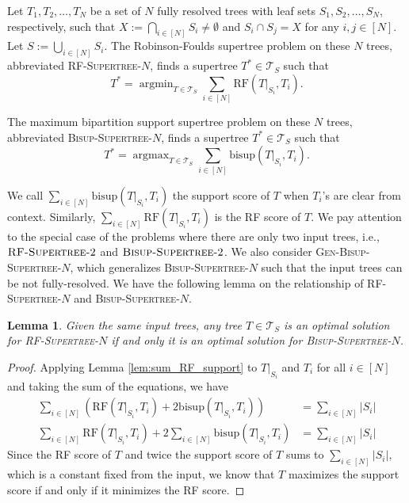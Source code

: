 \documentclass{bmcart}
\newcommand{\bs}{\mathrm{bisup}}
\newcommand{\RF}{\mathrm{RF}}
\newcommand{\bisuptwo}{\textsc{Bisup-Supertree-$2$}\xspace}
\newcommand{\bisupn}{\textsc{Bisup-Supertree-$N$}\xspace}
\newcommand{\genbisup}{\textsc{Gen-Bisup-Supertree-$N$}\xspace}
\newcommand{\rfn}{\textsc{RF-Supertree-$N$}\xspace}
\newcommand{\rftwo}{\textsc{RF-Supertree-$2$}\xspace}
\DeclareMathOperator*{\argmin}{argmin}
\DeclareMathOperator*{\argmax}{argmax}
\newtheorem{lemma}{Lemma}
\begin{document}


Let $T_1,T_2,\dots,T_N$ be a set of $N$ fully resolved trees with leaf sets $S_1,S_2,\dots,S_N$, respectively, such that $X:= \bigcap_{i \in [N]} S_i \neq \emptyset$ and $S_i \cap S_j = X$ for any $i,j \in [N]$. Let $S := \bigcup_{i \in [N]}S_i$. The Robinson-Foulds supertree problem on these $N$ trees, abbreviated \rfn, finds a supertree $T^* \in \mathcal{T}_S$ such that
\[T^* = \argmin_{T \in \mathcal{T}_S} \sum_{i \in [N]} \RF(T|_{S_i}, T_i).\]

The maximum bipartition support supertree problem on these $N$ trees, abbreviated \bisupn, finds a supertree $T^* \in \mathcal{T}_S$ such that
\[T^* = \argmax_{T \in \mathcal{T}_S} \sum_{i \in [N]} \bs(T|_{S_i}, T_i).\]

We call $\sum_{i\in[N]}\bs(T|_{S_i}, T_i)$ the support score of $T$ when $T_i$'s are clear from context. Similarly, $\sum_{i \in [N]} \RF(T|_{S_i}, T_i)$ is the RF score of $T$. We pay attention to the special case of the problems where there are only two input trees, i.e., $\rftwo$ and $\bisuptwo$. We also consider \genbisup, which generalizes \bisupn such that the input trees can be not fully-resolved. We have the following lemma on the relationship of \rfn and \bisupn.

\begin{lemma}
Given the same input trees, any tree $T \in \mathcal{T}_S$ is an optimal solution for \rfn if and only it is an optimal solution for \bisupn.
\end{lemma}
\begin{proof}
  Applying Lemma \ref{lem:sum_RF_support} to $T|_{S_i}$ and $T_i$ for all $i \in [N]$ and taking the sum of the equations, we have
  \begin{align*}
    \sum_{i \in [N]} (\RF(T|_{S_i}, T_i) + 2\bs(T|_{S_i},T_i)) &= \sum_{i \in [N]} |S_i| \\
    \sum_{i \in [N]} \RF(T|_{S_i}, T_i) + 2\sum_{i \in [N]}\bs(T|_{S_i},T_i) &= \sum_{i \in [N]} |S_i|
  \end{align*}
  Since the RF score of $T$ and twice the support score of $T$ sums to $\sum_{i \in [N]} |S_i|$, which is a constant fixed from the input, we know that $T$ maximizes the support score if and only if it minimizes the RF score.
\end{proof}
\end{document}
